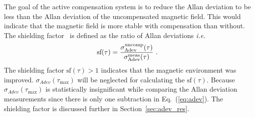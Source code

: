 




The goal of the active compensation system is to reduce the Allan deviation to be less than the Allan deviation of the uncompensated magnetic field. This would indicate that the magnetic field is more stable with compensation than without. The shielding factor~\cite{bea} is defined as the ratio of Allan deviations {\it i.e.}
\begin{equation}\label{eq:sf}
    \text{sf} (\tau)=\frac{\sigma_{\text{Adev}}^{\text{uncomp}}(\tau)}{\sigma_{\text{Adev}}^{\text{meas}}(\tau)}~{\rm .}
\end{equation}
The shielding factor $\text{sf} (\tau)>1$ indicates that the magnetic environment was improved. $\sigma_{Adev}(\tau_{\text{max}})$ will be neglected for calculating the $\text{sf} (\tau)$. Because $\sigma_{Adev}(\tau_{\text{max}})$ is statistically insignificant while comparing the Allan deviation measurements since there is only one subtraction in Eq.~(\ref{eq:adev}). The shielding factor is discussed further in Section~\ref{sec:adev_res}.
 

 
 
 
